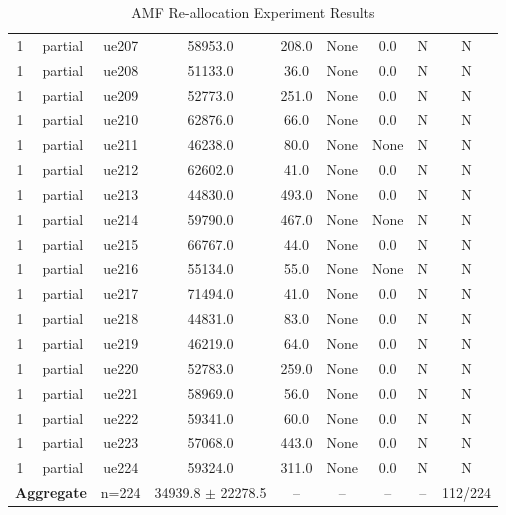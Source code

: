 \begin{table}[ht]
\begin{tabular}{|c|c|c|c|c|c|c|c|c|}
1 & partial & ue207 & 58953.0 & 208.0 & None & 0.0 & N & N \\
1 & partial & ue208 & 51133.0 & 36.0 & None & 0.0 & N & N \\
1 & partial & ue209 & 52773.0 & 251.0 & None & 0.0 & N & N \\
1 & partial & ue210 & 62876.0 & 66.0 & None & 0.0 & N & N \\
1 & partial & ue211 & 46238.0 & 80.0 & None & None & N & N \\
1 & partial & ue212 & 62602.0 & 41.0 & None & 0.0 & N & N \\
1 & partial & ue213 & 44830.0 & 493.0 & None & 0.0 & N & N \\
1 & partial & ue214 & 59790.0 & 467.0 & None & None & N & N \\
1 & partial & ue215 & 66767.0 & 44.0 & None & 0.0 & N & N \\
1 & partial & ue216 & 55134.0 & 55.0 & None & None & N & N \\
1 & partial & ue217 & 71494.0 & 41.0 & None & 0.0 & N & N \\
1 & partial & ue218 & 44831.0 & 83.0 & None & 0.0 & N & N \\
1 & partial & ue219 & 46219.0 & 64.0 & None & 0.0 & N & N \\
1 & partial & ue220 & 52783.0 & 259.0 & None & 0.0 & N & N \\
1 & partial & ue221 & 58969.0 & 56.0 & None & 0.0 & N & N \\
1 & partial & ue222 & 59341.0 & 60.0 & None & 0.0 & N & N \\
1 & partial & ue223 & 57068.0 & 443.0 & None & 0.0 & N & N \\
1 & partial & ue224 & 59324.0 & 311.0 & None & 0.0 & N & N \\
\multicolumn{2}{|c|}{\textbf{Aggregate}} & n=224 & 34939.8 $\pm$ 22278.5 & -- & -- & -- & -- & 112/224 \\
\hline
\end{tabular}
\caption{AMF Re-allocation Experiment Results}
\label{tab:amf_realloc}
\end{table}
